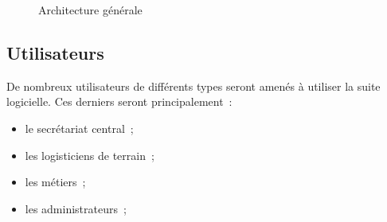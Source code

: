 \begin{figure}[htbp]
	\caption{Architecture générale}
	\label{architecture_generale}
\end{figure}

\label{liste_exhaustive_elts_contraintes}
\subsection{Utilisateurs}
De nombreux utilisateurs de différents types seront amenés à utiliser la suite logicielle. Ces derniers seront principalement~:
\begin{itemize}
	\item le secrétariat central~;
	\item les logisticiens de terrain~;
	\item les métiers~;
	\item les administrateurs~;
\end{itemize}

